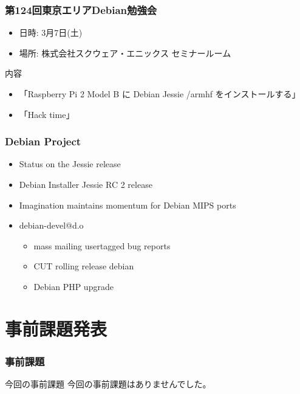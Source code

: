 \documentclass[cjk,dvipdfmx,10pt,compress,%
hyperref={bookmarks=true,bookmarksnumbered=true,bookmarksopen=false,%
colorlinks=false,%
pdftitle={第 96 回 関西 Debian 勉強会},%
pdfauthor={倉敷・のがた・佐々木・かわだ},%
pdfsubject={資料},%
}]{beamer}
\begin{document}
\begin{frame}[fragile]
  \frametitle{第124回東京エリアDebian勉強会}
  \begin{itemize}
  \item 日時: 3月7日(土)
  \item 場所: 株式会社スクウェア・エニックス セミナールーム
  \end{itemize}
  \begin{block}{内容}
    \begin{itemize}
    \item 「Raspberry Pi 2 Model B に Debian Jessie /armhf をインストールする」
    \item 「Hack time」
    \end{itemize}
  \end{block}
\end{frame}

\begin{frame}[fragile]
  \frametitle{Debian Project}
  \begin{itemize}
  \item Status on the Jessie release
  \item Debian Installer Jessie RC 2 release
  \item Imagination maintains momentum for Debian MIPS ports
  \item debian-devel@d.o
    \begin{itemize}
    \item mass mailing usertagged bug reports
    \item CUT rolling release debian
    \item Debian PHP upgrade
    \end{itemize}
  \end{itemize}
\end{frame}


\section{事前課題発表}


\begin{frame}[fragile]
  \frametitle{事前課題}
  \begin{block}{今回の事前課題}
    今回の事前課題はありませんでした。
  \end{block}
\end{frame}
\end{document}
